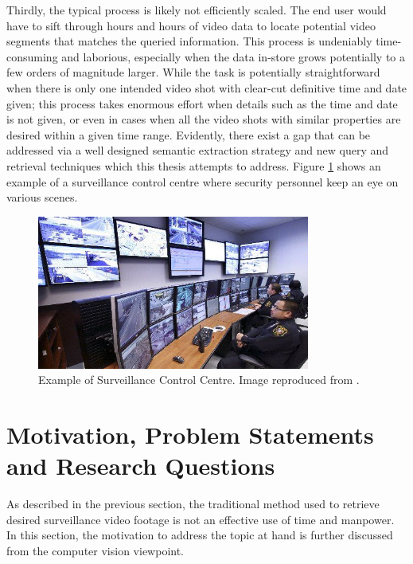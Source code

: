 Thirdly, the typical process is likely not efficiently scaled. The end user would have to sift through hours and hours of video data to locate potential video segments that matches the queried information. This %
process is undeniably time-consuming and laborious, especially when the data in-store grows potentially to a few orders of magnitude larger. While the task is potentially straightforward when there is only one intended video shot with clear-cut definitive time and date given; this process takes enormous effort when details such as the time and date is not given, or even in cases when all the video shots with similar properties are desired within a given time range. Evidently, there exist a gap that can be addressed
via a well designed semantic extraction strategy and new query and retrieval techniques which this thesis attempts to address. Figure \ref{fig:observerdatacenter} shows an example of a surveillance control centre where security personnel keep an eye on various scenes.

\begin{figure}[!hbt]\centering
\includegraphics[width=0.8\textwidth]{image/screenshots/observer.jpg}
\caption[Example of Surveillance Control Centre.]{Example of Surveillance Control Centre.
Image reproduced from .}
\label{fig:observerdatacenter}
\end{figure}

\section{Motivation, Problem Statements and Research Questions}

As described in the previous section, the traditional method used to retrieve desired surveillance video footage is not an effective use of time and manpower. In this section, the motivation to address the topic at hand is further discussed from the computer vision viewpoint.%

